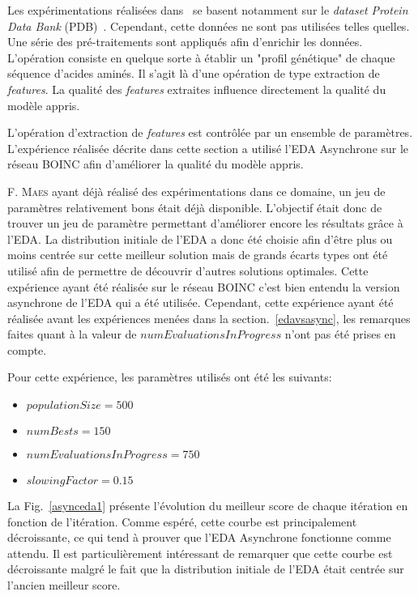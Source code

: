 \documentclass[a4paper, 11pt]{report}
\begin{document}
Les expérimentations réalisées dans~\cite{CAP} se basent notamment sur le \textit{dataset} \textit{Protein Data Bank} (PDB)~\cite{PDB}. Cependant, cette données ne sont pas utilisées telles quelles. Une série des pré-traitements sont appliqués afin d'enrichir les données. L'opération consiste en quelque sorte à établir un "profil génétique" de chaque séquence d'acides aminés. Il s'agit là d'une opération de type extraction de \textit{features}. La qualité des \textit{features} extraites influence directement la qualité du modèle appris.

L'opération d'extraction de \textit{features} est contrôlée par un ensemble de paramètres. L'expérience réalisée décrite dans cette section a utilisé l'EDA Asynchrone sur le réseau \textsc{BOINC} afin d'améliorer la qualité du modèle appris. 
 
F. \textsc{Maes} ayant déjà réalisé des expérimentations dans ce domaine, un jeu de paramètres relativement bons était déjà disponible. L'objectif était donc de trouver un jeu de paramètre permettant d'améliorer encore les résultats grâce à l'EDA. La distribution initiale de l'EDA a donc été choisie afin d'être plus ou moins centrée sur cette meilleur solution mais de grands écarts types ont été utilisé afin de permettre de découvrir d'autres solutions optimales. Cette expérience ayant été réalisée sur le réseau \textsc{BOINC} c'est bien entendu la version asynchrone de l'EDA qui a été utilisée. Cependant, cette expérience ayant été réalisée avant les expériences menées dans la section.~\ref{edavsasync}, les remarques faites quant à la valeur de $numEvaluationsInProgress$ n'ont pas été prises en compte.

Pour cette expérience, les paramètres utilisés ont été les suivants:
\begin{itemize}
\item $populationSize = 500$
\item $numBests = 150$
\item $numEvaluationsInProgress = 750$
\item $slowingFactor = 0.15$
\end{itemize}

La Fig.~\ref{asynceda1} présente l'évolution du meilleur score de chaque itération en fonction de l'itération. Comme espéré, cette courbe est principalement décroissante, ce qui tend à prouver que l'EDA Asynchrone fonctionne comme attendu. Il est particulièrement intéressant de remarquer que cette courbe est décroissante malgré le fait que la distribution initiale de l'EDA était centrée sur l'ancien meilleur score. 
\end{document}
